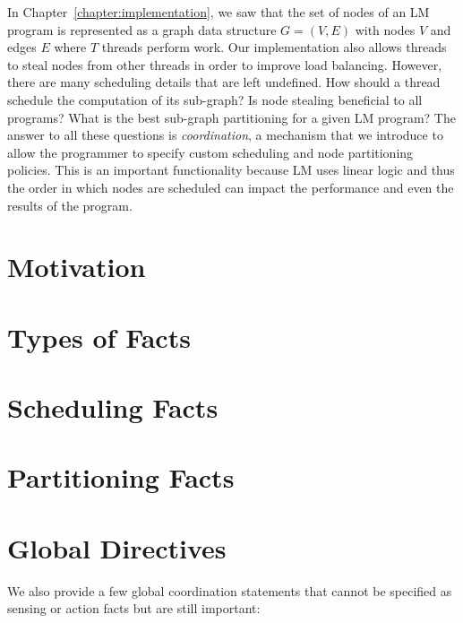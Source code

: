 In Chapter~\ref{chapter:implementation}, we saw that the set of nodes
of an LM program is represented as a graph data structure $G = (V, E)$ with nodes $V$
and edges $E$ where $T$ threads perform work. Our implementation also allows
threads to steal nodes from other threads in order to improve load balancing.
However, there are many scheduling details that are left undefined. How should a
thread schedule the computation of its sub-graph? Is node stealing beneficial to
all programs? What is the best sub-graph partitioning for a given LM program?
The answer to all these questions is \emph{coordination}, a mechanism that we
introduce to allow the programmer to specify custom scheduling and node
partitioning policies. This is an important functionality because LM uses linear
logic and thus the order in which nodes are scheduled can impact the performance
and even the results of the program.

\section{Motivation}\label{section:coord:rationale}



\section{Types of Facts}



\section{Scheduling Facts}\label{sec:coord:fifo}



\section{Partitioning Facts}


\section{Global Directives}

We also provide a few global coordination statements that cannot be specified
as sensing or action facts but are still important:

